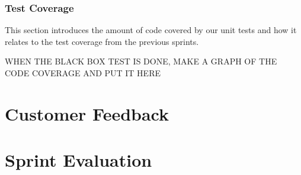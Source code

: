 \subsubsection{Test Coverage}
This section introduces the amount of code covered by our unit tests and how it relates to the test coverage from the previous sprints.

WHEN THE BLACK BOX TEST IS DONE, MAKE A GRAPH OF THE CODE COVERAGE AND PUT IT HERE

 


\section{Customer Feedback}


\section{Sprint Evaluation}


